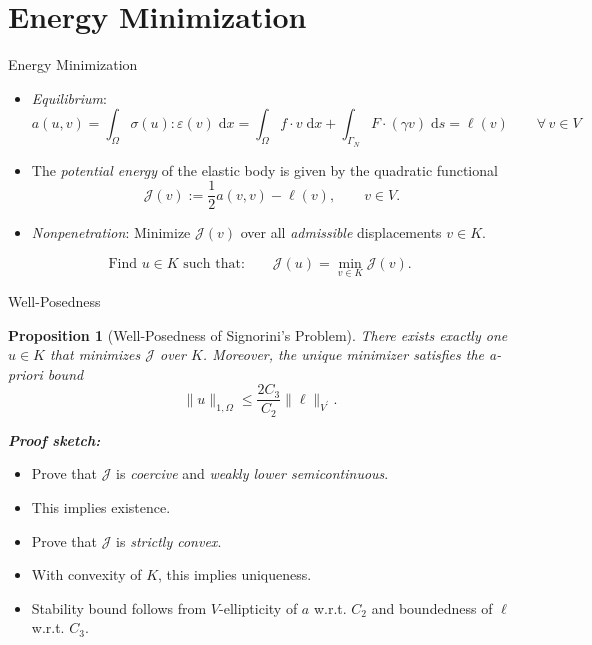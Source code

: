 \documentclass[10pt,aspectratio=169]{beamer}
\newtheorem{proposition}{Proposition}[section]
\def\cJ{{\mathcal J}}
\def\d{{\mathrm{d}}}
\def\dx{{\d x}}
\def\ds{{\d s}}
\begin{document}
\section{Energy Minimization}

\begin{frame}{Energy Minimization}
	\begin{itemize}
		\item {\em Equilibrium}:
		      \begin{equation*}
			      a(u,v) = \int_\Omega \sigma(u):\varepsilon(v)\;\dx = \int_\Omega f\cdot v\;\dx +\int_{\Gamma_N} F\cdot(\gamma v)\;\ds = \ell(v)\qquad \forall\, v\in V
		      \end{equation*}
		\item The {\em potential energy} of the elastic body is given by the quadratic functional
		      \begin{equation*}
			      \cJ(v):= \frac{1}{2}a(v,v)-\ell(v),\qquad v\in V.
		      \end{equation*}
		\item {\em Nonpenetration}: Minimize $\cJ(v)$ over all {\em admissible} displacements $v\in K$.
	\end{itemize}

	\begin{problem}
	\begin{equation*}
		\text{Find }u\in K\text{ such that:}\qquad \cJ(u) = \min_{v\in K}\cJ(v).
	\end{equation*}
	\end{problem}
\end{frame}

\begin{frame}{Well-Posedness}
	\begin{proposition}[Well-Posedness of Signorini's Problem]
		There exists exactly one $u\in K$ that minimizes $\cJ$ over $K$. Moreover, the unique minimizer satisfies the a-priori bound
		\begin{equation*}
			\|u\|_{1,\Omega} \le \frac{2 C_3}{C_2} \|\ell\|_{V^\prime}.
		\end{equation*}
	\end{proposition}
	\textbf{\em Proof sketch:}
	\begin{itemize}
		\item Prove that $\cJ$ is {\em coercive} and {\em weakly lower semicontinuous}.
		\item This implies existence.
		\item Prove that $\cJ$ is {\em strictly convex}.
		\item With convexity of $K$, this implies uniqueness.
		\item Stability bound follows from $V$-ellipticity of $a$ w.r.t. $C_2$ and boundedness of $\ell$ w.r.t. $C_3$.
	\end{itemize}
\end{frame}
\end{document}
